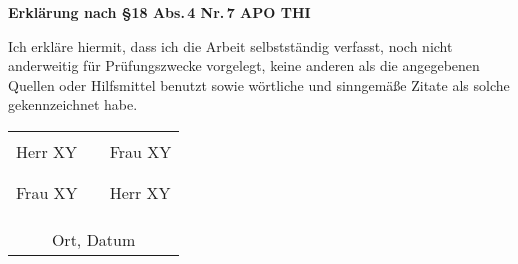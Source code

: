 \label{erklaerung}
\vspace*{1cm}

\vspace{1cm}

\Large{\textbf{Erklärung nach \S 18 Abs.\,4 Nr.\,7 APO THI}}
\normalsize
\vspace{1cm}

Ich erkläre hiermit, dass ich die Arbeit selbstständig verfasst, noch nicht anderweitig für
Prüfungszwecke vorgelegt, keine anderen als die angegebenen Quellen oder Hilfsmittel
benutzt sowie wörtliche und sinngemäße Zitate als solche gekennzeichnet habe.

\vspace*{3.5cm}



\begin{table}[H]
\centering
\begin{tabular}{lll}
\underline{\hspace{7cm}} &  & \underline{\hspace{7cm}} \\
Herr XY                  &  & Frau XY                  \\
                         &  &                          \\
\underline{\hspace{7cm}} &  & \underline{\hspace{7cm}} \\
Frau XY                  &  & Herr XY                  \\
\\
\\
\multicolumn{3}{c}{\underline{\hspace{10cm}}}           \\
\multicolumn{3}{c}{Ort, Datum}                        
\end{tabular}
\end{table}











